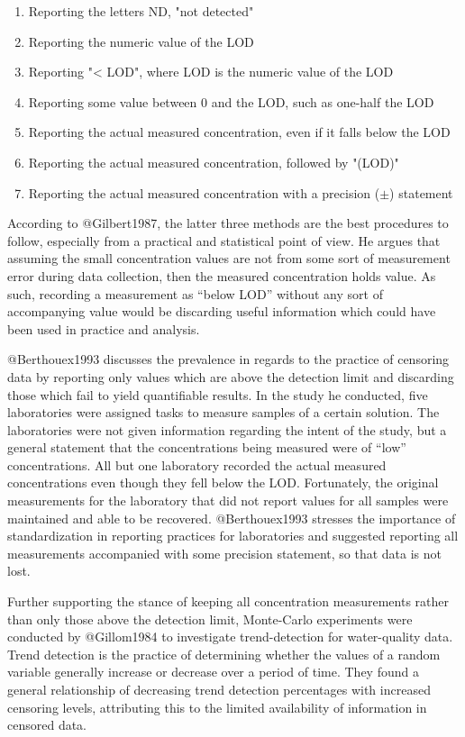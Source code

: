 \documentclass[
]{article}
\begin{document}
\begin{enumerate}
  \item Reporting the letters ND, "not detected"
  \item Reporting the numeric value of the LOD
  \item Reporting "< LOD", where LOD is the numeric value of the LOD 
  \item Reporting some value between 0 and the LOD, such as one-half the LOD
  \item Reporting the actual measured concentration, even if it falls below the LOD
  \item Reporting the actual measured concentration, followed by "(LOD)" 
  \item Reporting the actual measured concentration with a precision ($\pm$) statement
\end{enumerate}

According to @Gilbert1987, the latter three methods are the best
procedures to follow, especially from a practical and statistical point
of view. He argues that assuming the small concentration values are not
from some sort of measurement error during data collection, then the
measured concentration holds value. As such, recording a measurement as
``below LOD'' without any sort of accompanying value would be discarding
useful information which could have been used in practice and analysis.

@Berthouex1993 discusses the prevalence in regards to the practice of
censoring data by reporting only values which are above the detection
limit and discarding those which fail to yield quantifiable results. In
the study he conducted, five laboratories were assigned tasks to measure
samples of a certain solution. The laboratories were not given
information regarding the intent of the study, but a general statement
that the concentrations being measured were of ``low'' concentrations.
All but one laboratory recorded the actual measured concentrations even
though they fell below the LOD. Fortunately, the original measurements
for the laboratory that did not report values for all samples were
maintained and able to be recovered. @Berthouex1993 stresses the
importance of standardization in reporting practices for laboratories
and suggested reporting all measurements accompanied with some precision
statement, so that data is not lost.

Further supporting the stance of keeping all concentration measurements
rather than only those above the detection limit, Monte-Carlo
experiments were conducted by @Gillom1984 to investigate trend-detection
for water-quality data. Trend detection is the practice of determining
whether the values of a random variable generally increase or decrease
over a period of time. They found a general relationship of decreasing
trend detection percentages with increased censoring levels, attributing
this to the limited availability of information in censored data.
\end{document}
